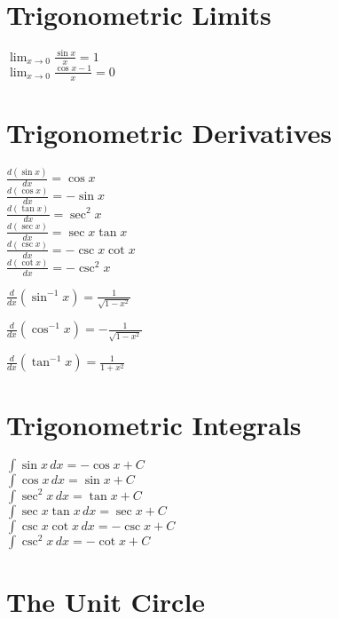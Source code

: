 \documentclass[12 pt]{article}
\begin{document}
\begin{multicols}{2}
\section*{Trigonometric Limits}

$\displaystyle \lim_{x\to 0}\frac{\sin x}{x}=1$\\

$\displaystyle \lim_{x\to 0}\frac{\cos x-1}{x}=0$\\

\section*{Trigonometric Derivatives}
\noindent $\displaystyle \frac{d(\sin x)}{dx}=\cos x$\\

\noindent $\displaystyle \frac{d(\cos x)}{dx}=-\sin x$\\

\noindent $\displaystyle \frac{d(\tan x)}{dx}=\sec^2 x$\\ 

\noindent $\displaystyle \frac{d(\sec x)}{dx}=\sec x\tan x$\\

\noindent $\displaystyle \frac{d(\csc x)}{dx}=-\csc x\cot x$\\

\noindent $\displaystyle \frac{d(\cot x)}{dx}=-\csc^2 x$

\noindent $\displaystyle\frac{d}{d x}\left(\sin ^{-1} x\right) =\frac{1}{\sqrt{1-x^{2}}}$

\noindent $\displaystyle\frac{d}{d x}\left(\cos ^{-1} x\right) =-\frac{1}{\sqrt{1-x^{2}}}$

\noindent $\displaystyle\frac{d}{d x}\left(\tan ^{-1} x\right) =\frac{1}{1+x^{2}}$

\section*{Trigonometric Integrals}
\noindent $\displaystyle \int\sin x\,dx =-\cos x+C$\\

\noindent $\displaystyle \int\cos x\,dx =\sin x+C$\\

\noindent $\displaystyle \int\sec^2x\,dx =\tan x+C$\\

\noindent $\displaystyle \int\sec x\tan x\,dx =\sec x+C$\\

\noindent $\displaystyle \int\csc x\cot x\,dx =-\csc x+C$\\

\noindent $\displaystyle \int\csc^2x\,dx =-\cot x+C$\\
\end{multicols}


\newpage
\section*{The Unit Circle}
\begin{center}

\resizebox{5.75in}{!}{

}
\end{center}
\end{document}
